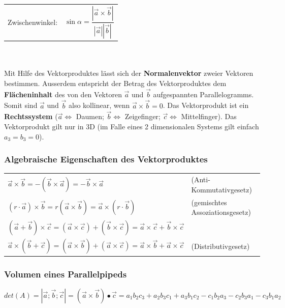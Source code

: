 	\begin{tabular}{ll}
		Zwischenwinkel: &
		\begin{equation*}
			\sin\alpha = \frac{|\vec{a} \times \vec{b}|}{|\vec{a}||\vec{b}|}
		\end{equation*}
	\end{tabular}\\ \\

	Mit Hilfe des Vektorproduktes lässt sich der \textbf{Normalenvektor}
	zweier Vektoren bestimmen. Ausserdem entspricht der Betrag des Vektorproduktes
	dem \textbf{Flächeninhalt} des von den Vektoren $\vec{a}$ und $\vec{b}$
	aufgespannten Parallelogramms. Somit sind $\vec{a}$ und $\vec{b}$ also
	kollinear, wenn $\vec{a}\times\vec{b}=0$. Das Vektorprodukt ist ein
	\textbf{Rechtssystem}
	($\vec{a} \Leftrightarrow$ Daumen; $\vec{b} \Leftrightarrow$ Zeigefinger;
	$\vec{c} \Leftrightarrow$ Mittelfinger). Das Vektorprodukt gilt nur in 3D (im
	Falle eines 2 dimensionalen Systems gilt einfach $a_3 = b_3 = 0$).

	\subsubsection{Algebraische Eigenschaften des Vektorproduktes}
		\begin{tabular}{ll}
			$\vec{a}\times\vec{b} = -(\vec{b}\times\vec{a}) = -\vec{b}\times\vec{a}$
			&(Anti-Kommutativgesetz)\\
			$(r\cdot\vec{a})\times\vec{b} = r(\vec{a}\times\vec{b}) = \vec{a}\times(r\cdot\vec{b})$
			&(gemischtes Assoziationsgesetz)\\
			$(\vec{a}+\vec{b})\times\vec{c} = (\vec{a}\times\vec{c})+(\vec{b}\times\vec{c})
			= \vec{a}\times\vec{c}+\vec{b}\times\vec{c}$\\
			$\vec{a}\times(\vec{b}+\vec{c}) = (\vec{a}\times\vec{b})+(\vec{a}\times\vec{c})
			= \vec{a}\times\vec{b}+\vec{a}\times\vec{c}$ &(Distributivgesetz)
		\end{tabular}
	
	\subsubsection{Volumen eines Parallelpipeds}
		\begin{equation*}
			det(A) = |\vec{a}; \vec{b}; \vec{c}| = (\vec{a} \times \vec{b}) \bullet \vec{c} = a_1b_2c_3 + a_2b_3c_1 + a_3b_1c_2 - c_1b_2a_3 - c_2b_3a_1 - c_3b_1a_2
		\end{equation*}

